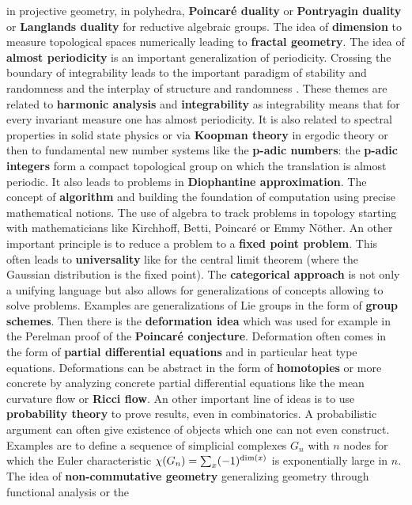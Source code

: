 \documentclass[12pt]{amsart}
\newcounter{example}    \def\example#1{ \item \fontsize{12}{15} \selectfont #1 \fontsize{12}{15} \selectfont }
\begin{document}
in projective geometry, in polyhedra, {\bf Poincar\'e duality} or {\bf Pontryagin duality} or {\bf Langlands duality}
for reductive algebraic groups. The idea of {\bf dimension} to measure topological spaces numerically leading to 
{\bf fractal geometry}. The idea of {\bf almost periodicity} is an important generalization
of periodicity. Crossing the boundary of integrability leads to the important paradigm of
stability and randomness \cite{MoserStableRandom} 
and the interplay of structure and randomness \cite{TaoStructureRandomness}.
These themes are related to {\bf harmonic analysis} and {\bf integrability} as integrability means that for every 
invariant measure one has almost periodicity. It is also related to spectral properties in solid state physics or via 
{\bf Koopman theory} in ergodic theory or then to fundamental new number systems like the 
{\bf p-adic numbers}: the {\bf p-adic integers} form a compact topological
group on which the translation is almost periodic. It also leads to problems in 
{\bf Diophantine approximation}. The concept of {\bf algorithm} and building the foundation of computation using
precise mathematical notions. The use of algebra to track problems in topology
starting with mathematicians like Kirchhoff, Betti, Poincar\'e or Emmy N\"other.
An other important principle is to reduce a problem to 
a {\bf fixed point problem}. This often leads to {\bf universality} like for the central limit theorem (where the 
Gaussian distribution is the fixed point). The {\bf categorical approach} is not only a unifying language
but also allows for generalizations of concepts allowing to solve problems. Examples are generalizations of 
Lie groups in the form of {\bf group schemes}. 
Then there is the {\bf deformation idea} which was used for example in the Perelman proof of the
{\bf Poincar\'e conjecture}. Deformation often comes in the form of {\bf partial differential equations}
and in particular heat type equations. Deformations can be abstract in the form of {\bf homotopies} or more concrete
by analyzing concrete partial differential equations like the {\rm mean curvature flow} or {\bf Ricci flow}. 
An other important line of ideas is to use {\bf probability theory} to prove results, even in combinatorics. 
A probabilistic argument can often give existence of objects which one can not even construct. Examples are 
to define a sequence of simplicial complexes $G_n$ with $n$ nodes for which the Euler characteristic $\chi(G_n)= \sum_x (-1)^{{\rm dim}(x)}$
is exponentially large in $n$. The idea of {\bf non-commutative geometry} generalizing geometry through functional analysis or the 
\end{document}
